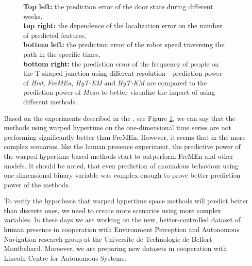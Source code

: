 \begin{figure}[!b]
\begin{center}
{\textbf{Top left:} the prediction error of the door state during different weeks,\\
\textbf{top right:} the dependence of the localization error on the number of predicted features,\\
\textbf{bottom left:} the prediction error of the robot speed traversing the path in the specific times,\\
\textbf{bottom right:} the prediction error of the frequency of people on the T-shaped junction using different resolution - prediction power of \textit{Hist}, \textit{FreMEn}, \textit{HyT-EM} and \textit{HyT-KM} are compared to the prediction power of \textit{Mean} to better visualize the impact of using different methods.
\label{fig:complexControl}}
   \end{center}
\end{figure}

Based on the experiments described in the \cite{krajnik2018warped}, see Figure \ref{fig:complexControl}, we can say that the methods using warped hypertime on the one-dimensional time series are not performing significantly better than FreMEn.
However, it seems that in the more complex scenarios, like the human presence experiment, the predictive power of the warped hypertime based methods start to outperform FreMEn and other models.
It should be noted, that even prediction of anomalous behaviour \cite{Vintr2018Spatiotemporal} using one-dimensional binary variable was
complex enough to prove better prediction power of the  methods.

To verify the hypothesis that warped hypertime space methods will predict better than discrete ones, we need to create more scenarios using more complex variables.
In these days we are working on the new, better-controlled dataset of human presence in cooperation with Environment Perception and Autonomous Navigation research group at the Universite de Technologie de Belfort-Montbeliard.
Moreover, we are preparing new datasets in cooperation with Lincoln Centre for Autonomous Systems.



